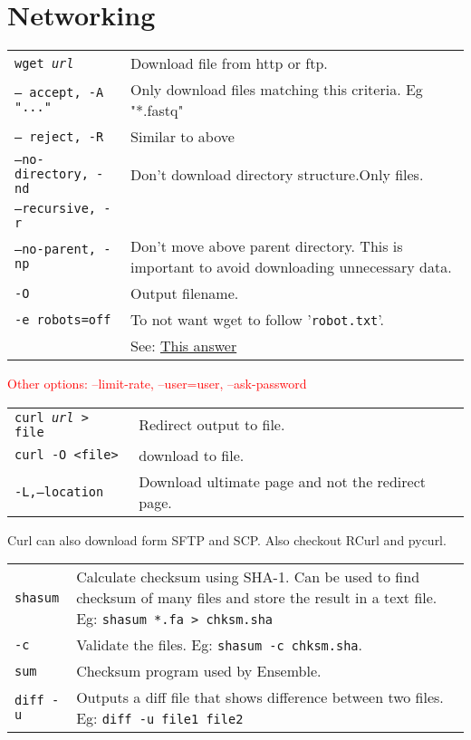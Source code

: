 \section{Networking}

\begin{tabularx}{\linewidth}{lX}
\hline
\texttt{wget \textit{url}} & Download file from http or ftp.\\
\texttt{-- accept, -A "..."} & Only download files matching this criteria. Eg "*.fastq"\\
\texttt{-- reject, -R} & Similar to above\\
\texttt{--no-directory, -nd} & Don't download directory structure.Only files.\\
\texttt{--recursive, -r} & \\
\texttt{--no-parent, -np} & Don't move above parent directory. This is important to avoid downloading unnecessary data.\\
\texttt{-O} & Output filename.\\
\texttt{-e robots=off} & To not want wget to follow '\texttt{robot.txt}'.\\
& See: \href{https://stackoverflow.com/a/11124664}{This answer} \\
\hline
\end{tabularx}

\textcolor{red}{Other options: --limit-rate, --user=user, --ask-password}\\


\begin{tabularx}{\linewidth}{lX}
\hline
\texttt{curl \textit{url} > file} & Redirect output to file.\\
\texttt{curl -O <file>} & download to file.\\
\texttt{-L,--location} & Download ultimate page and not the redirect page.\\
\hline
\end{tabularx}
Curl can also download form SFTP and SCP. Also checkout RCurl and pycurl.

\begin{tabularx}{\linewidth}{lX}
\hline
\texttt{shasum} & Calculate checksum using SHA-1. Can be used to find checksum of many files and store the result in a text file. Eg: \texttt{shasum *.fa > chksm.sha}\\
\texttt{-c} & Validate the files. Eg: \texttt{shasum -c chksm.sha}.\\
\texttt{sum} & Checksum program used by Ensemble.\\
\texttt{diff -u} & Outputs a diff file that shows difference between two files. Eg: \texttt{diff -u file1 file2}\\
\hline
\end{tabularx}

\vfill \null
\columnbreak

